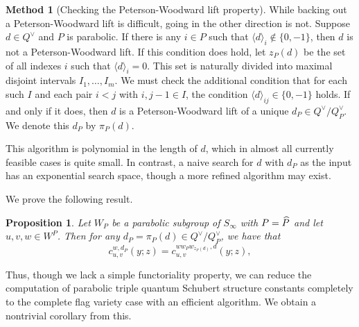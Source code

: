 \documentclass{amsart}
\newtheorem{proposition}[lemma]{Proposition}
\theoremstyle{definition}
\newtheorem{method}[lemma]{Method}
\theoremstyle{remark}
\numberwithin{equation}{section}
\begin{document}
 \begin{method}[Checking the Peterson-Woodward lift property]
 While backing out a Peterson-Woodward lift is difficult, going in the other direction is not. Suppose $d\in Q^\vee$ and $P$ is parabolic. If there is any $i\in P$ such that $\langle d\rangle_i\notin\{0,-1\}$, then $d$ is not a Peterson-Woodward lift. If this condition does hold, let $z_P(d)$ be the set of all indexes $i$ such that $\langle d\rangle_i = 0$. This set is naturally divided into maximal disjoint intervals $I_1,\ldots,I_m$. We must check the additional condition that for each such $I$ and each pair $i<j$ with $i,j-1\in I$, the condition $\langle d\rangle_{ij}\in\{0,-1\}$ holds. If and only if it does, then $d$ is a Peterson-Woodward lift of a unique $d_P\in Q^\vee/Q^\vee_P$. We denote this $d_P$ by $\pi_P(d)$. 
 \end{method}

 This algorithm is polynomial in the length of $d$, which in almost all currently feasible cases is quite small. In contrast, a naive search for $d$ with $d_P$ as the input has an exponential search space, though a more refined algorithm may exist.

 We prove the following result.

 \begin{proposition}
Let $W_P$ be a parabolic subgroup of $S_\infty$ with $P=\widehat{P}$ and let $u,v,w\in W^{P}$. Then for any $d_P = \pi_P(d)\in Q^\vee/Q_P^\vee$, we have that
$$c_{u,v}^{w,d_P}(y;z) = c_{u,v}^{ww_Pw_{z_P(d)},d}(y;z),$$
\end{proposition}

Thus, though we lack a simple functoriality property, we can reduce the computation of parabolic triple quantum Schubert structure constants completely to the complete flag variety case with an efficient algorithm. We obtain a nontrivial corollary from this.
\end{document}
